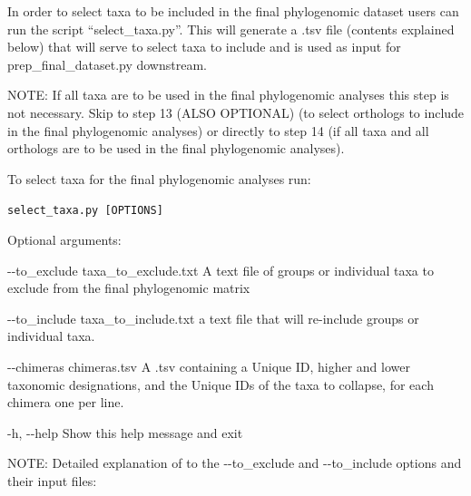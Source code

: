 \documentclass{article}
\def\code#1{\texttt{#1}}
\begin{document}
\begin{enumerate}[itemsep=12pt]
    \vspace{0.2cm}
    In order to select taxa to be included in the final phylogenomic dataset users can run the script “select\_taxa.py”. This will generate a .tsv file (contents explained below) that will serve to select taxa to include and is used as input for prep\_final\_dataset.py downstream.
    
    \vspace{0.2cm}
    NOTE: If all taxa are to be used in the final phylogenomic analyses this step is not necessary. Skip to step 13 (ALSO OPTIONAL) (to select orthologs to include in the final phylogenomic analyses) or directly to step 14 (if all taxa and all orthologs are to be used in the final phylogenomic analyses).
    
    \vspace{0.2cm}
    To select taxa for the final phylogenomic analyses run:
    
    \vspace{0.2cm}
    \code{select\_taxa.py [OPTIONS]}
    \vspace{0.2cm}
    
    \begin{description}
        \item Optional arguments:
        \begin{description}
            \item -\/-to\_exclude \hspace{0.2cm} taxa\_to\_exclude.txt \hspace{0.2cm} A text file of groups or individual taxa to exclude from the final phylogenomic matrix
            \item -\/-to\_include \hspace{0.2cm} taxa\_to\_include.txt \hspace{0.2cm} a text file that will re-include groups or individual taxa.
            \item -\/-chimeras \hspace{0.2cm} chimeras.tsv \hspace{0.2cm} A .tsv containing a Unique ID, higher and lower taxonomic designations, and the Unique IDs of the taxa to collapse, for each chimera one per line.
            \item -h, -\/-help \hspace{0.2cm} Show this help message and exit
        \end{description}
    \end{description}
    
    \vspace{0.4cm}
    NOTE: Detailed explanation of to the -\/-to\_exclude and -\/-to\_include options and their input files:
    

\end{enumerate}
\end{document}
